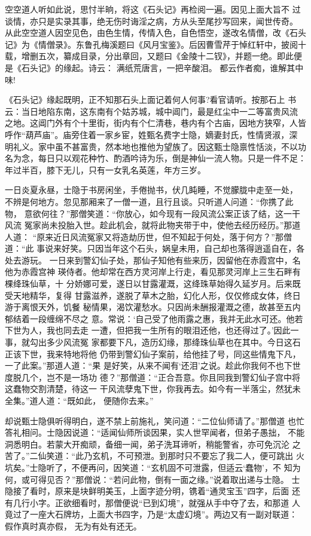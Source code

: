 空空道人听如此说，思忖半晌，将这《石头记》再检阅一遍。因见上面大旨不
过谈情，亦只是实录其事，绝无伤时诲淫之病，方从头至尾抄写回来，闻世传奇。
从此空空道人因空见色，由色生情，传情入色，自色悟空，遂改名情僧，改《石头
记》为《情僧录》。东鲁孔梅溪题曰《风月宝鉴》。后因曹雪芹于悼红轩中，披阅十
载，增删五次，纂成目录，分出章回，又题曰《金陵十二钗》，并题一绝。即此便
是《石头记》的缘起。诗云：
满纸荒唐言，一把辛酸泪。
都云作者痴，谁解其中味!

《石头记》缘起既明，正不知那石头上面记着何人何事?看官请听。按那石上
书云：当日地陷东南，这东南有个姑苏城，城中阊门，最是红尘中一二等富贵风流
之地。这阊门外有个十里街，街内有个仁清巷，巷内有个古庙，因地方狭窄，人皆
呼作“葫芦庙”。庙旁住着一家乡宦，姓甄名费字士隐，嫡妻封氏，性情贤淑，深
明礼义。家中虽不甚富贵，然本地也推他为望族了。因这甄士隐禀性恬淡，不以功
名为念，每日只以观花种竹、酌酒吟诗为乐，倒是神仙一流人物。只是一件不足：
年过半百，膝下无儿，只有一女乳名英莲，年方三岁。

一日炎夏永昼，士隐于书房闲坐，手倦抛书，伏几盹睡，不觉朦胧中走至一处，
不辨是何地方。忽见那厢来了一僧一道，且行且谈。只听道人问道：“你携了此物，
意欲何往？”那僧笑道：“你放心，如今现有一段风流公案正该了结，这一干风流
冤家尚未投胎入世。趁此机会，就将此物夹带于中，使他去经历经历。”那道人道：
“原来近日风流冤家又将造劫历世，但不知起于何处，落于何方？”那僧道：“此
事说来好笑。只因当年这个石头，娲皇未用，自己却也落得逍遥自在，各处去游玩。
一日来到警幻仙子处，那仙子知他有些来历，因留他在赤霞宫中，名他为赤霞宫神
瑛侍者。他却常在西方灵河岸上行走，看见那灵河岸上三生石畔有棵绛珠仙草，十
分娇娜可爱，遂日以甘露灌溉，这绛珠草始得久延岁月。后来既受天地精华，复得
甘露滋养，遂脱了草木之胎，幻化人形，仅仅修成女体，终日游于离恨天外，饥餐
秘情果，渴饮灌愁水。只因尚未酬报灌溉之德，故甚至五内郁结着一段缠绵不尽之
意。常说：‘自己受了他雨露之惠，我并无此水可还。他若下世为人，我也同去走
一遭，但把我一生所有的眼泪还他，也还得过了。’因此一事，就勾出多少风流冤
家都要下凡，造历幻缘，那绛珠仙草也在其中。今日这石正该下世，我来特地将他
仍带到警幻仙子案前，给他挂了号，同这些情鬼下凡，一了此案。”那道人道：“果
是好笑，从来不闻有‘还泪’之说。趁此你我何不也下世度脱几个，岂不是一场功
德？”那僧道：“正合吾意。你且同我到警幻仙子宫中将这蠢物交割清楚，待这一
干风流孽鬼下世，你我再去。如今有一半落尘，然犹未全集。”道人道：“既如此，
便随你去来。”

却说甄士隐俱听得明白，遂不禁上前施礼，笑问道：“二位仙师请了。”那僧道
也忙答礼相问。士隐因说道：“适闻仙师所谈因果，实人世罕闻者，但弟子愚拙，
不能洞悉明白。若蒙大开痴顽，备细一闻，弟子洗耳谛听，稍能警省，亦可免沉沦
之苦了。”二仙笑道：“此乃玄机，不可预泄。到那时只不要忘了我二人，便可跳出
火坑矣。”士隐听了，不便再问，因笑道：“玄机固不可泄露，但适云‘蠢物’，不
知为何，或可得见否？”那僧说：“若问此物，倒有一面之缘。”说着取出递与士隐。
士隐接了看时，原来是块鲜明美玉，上面字迹分明，镌着“通灵宝玉”四字，后面
还有几行小字。正欲细看时，那僧便说“已到幻境”，就强从手中夺了去，和那道
人竟过了一座大石牌坊，上面大书四字，乃是“太虚幻境”。两边又有一副对联道：
假作真时真亦假，
无为有处有还无。

